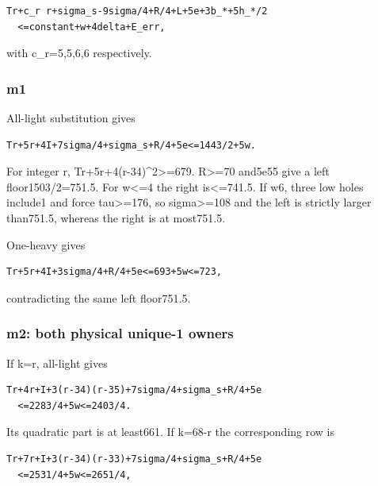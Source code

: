 \documentclass[10pt,a4paper]{article}
\theoremstyle{definition}
\begin{document}
\begin{lstlisting}
Tr+c_r r+sigma_s-9sigma/4+R/4+L+5e+3b_*+5h_*/2
  <=constant+w+4delta+E_err,
\end{lstlisting}

with c\_\allowbreak{}r=\allowbreak{}5,\allowbreak{}5,\allowbreak{}6,\allowbreak{}6 respectively.

\hypertarget{m1}{%
\subsubsection{m1}\label{m1}}

All-light substitution gives

\begin{lstlisting}
Tr+5r+4I+7sigma/4+sigma_s+R/4+5e<=1443/2+5w.
\end{lstlisting}

For integer r,\allowbreak{} Tr+\allowbreak{}5r+\allowbreak{}4(r-34)\^{}2\textgreater=\allowbreak{}679. R\textgreater=\allowbreak{}70
and5e55 give a left floor1503/2=\allowbreak{}751.5. For w\textless=\allowbreak{}4 the right
is\textless=\allowbreak{}741.5. If w6,\allowbreak{} three low holes include1 and force
tau\textgreater=\allowbreak{}176,\allowbreak{} so sigma\textgreater=\allowbreak{}108 and the left is strictly
larger than751.5,\allowbreak{} whereas the right is at most751.5.

One-heavy gives

\begin{lstlisting}
Tr+5r+4I+3sigma/4+R/4+5e<=693+5w<=723,
\end{lstlisting}

contradicting the same left floor751.5.

\hypertarget{m2-both-physical-unique-1-owners}{%
\subsubsection{m2: both physical unique-1
owners}\label{m2-both-physical-unique-1-owners}}

If k=\allowbreak{}r,\allowbreak{} all-light gives

\begin{lstlisting}
Tr+4r+I+3(r-34)(r-35)+7sigma/4+sigma_s+R/4+5e
  <=2283/4+5w<=2403/4.
\end{lstlisting}

Its quadratic part is at least661. If k=\allowbreak{}68-r the corresponding row is

\begin{lstlisting}
Tr+7r+I+3(r-34)(r-33)+7sigma/4+sigma_s+R/4+5e
  <=2531/4+5w<=2651/4,
\end{lstlisting}
\end{document}
